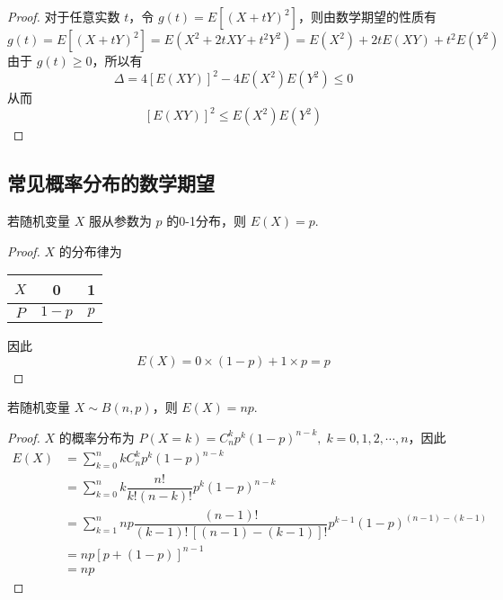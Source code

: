 \begin{proof}
    对于任意实数 $t$，令 $g(t) = E[(X+tY)^2]$，则由数学期望的性质有
    $$
    g(t) = E[(X+tY)^2] = E(X^2 + 2tXY + t^2 Y^2) = E(X^2) + 2tE(XY) + t^2 E(Y^2)
    $$
    由于 $g(t) \geqslant 0$，所以有
    $$
    \varDelta = 4 [E(XY)]^2 - 4 E(X^2) E(Y^2) \leqslant 0
    $$
    从而
    $$
    [E(XY)]^2 \leqslant E(X^2) E(Y^2)
    $$
\end{proof}

\subsection{常见概率分布的数学期望}

\begin{conclusion}
    \indent 若随机变量 $X$ 服从参数为 $p$ 的0-1分布，则 $E(X) = p$.
\end{conclusion}

\begin{proof}
    $X$ 的分布律为

    \begin{center}
        \begin{tabular}{c | c c}
            \hline
            $X$ & 0 & 1 \\
            \hline
            $P$ & $1-p$ & $p$ \\
            \hline
        \end{tabular}
    \end{center}

    因此
    $$
    E(X) = 0 \times (1-p) + 1 \times p = p
    $$
\end{proof}

\begin{conclusion}
    \indent 若随机变量 $X \sim B(n,p)$，则 $E(X) = np$.
\end{conclusion}

\begin{proof}
    $X$ 的概率分布为 $P(X=k) = C_n^k p^k (1-p)^{n-k}, \; k=0,1,2,\cdots,n$，因此
    $$
    \begin{aligned}
        E(X) &= \sum_{k=0}^n k C_n^k p^k (1-p)^{n-k} \\
        &= \sum_{k=0}^n k \dfrac{n!}{k! (n-k)!} p^k (1-p)^{n-k} \\
        &= \sum_{k=1}^n np \dfrac{(n-1)!}{(k-1)! \, [(n-1)-(k-1)]!} p^{k-1} (1-p)^{(n-1)-(k-1)} \\
        &= np[p+(1-p)]^{n-1} \\
        &= np
    \end{aligned}
    $$
\end{proof}

